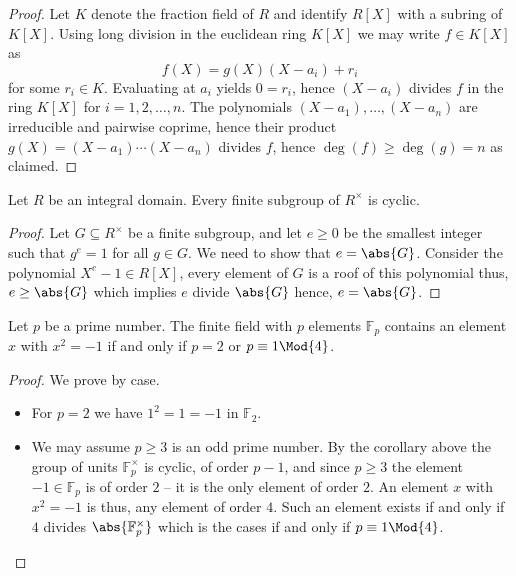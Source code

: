 \documentclass[12pt, a4paper]{article}
\begin{document}
\begin{proof}
    Let \( K \) denote the fraction field of \( R \) and identify \( R[X] \) with a subring of \( K[X] \). Using long division in the euclidean ring \( K[X] \) we may write \( f \in K[X] \) as
    \[f(X) = g(X)(X - a_i) + r_i\]
    for some \( r_i \in K \). Evaluating at \( a_i \) yields \( 0 = r_i \), hence \( (X - a_i) \) divides \( f \) in the ring \( K[X] \) for \( i = 1, 2, \ldots, n \). The polynomials \( (X - a_1), \ldots, (X - a_n) \) are irreducible and pairwise coprime, hence their product \( g(X) = (X - a_1) \cdots (X - a_n) \) divides \( f \), hence \( \deg(f) \geq \deg(g) = n \) as claimed. 
\end{proof}

\begin{mdcor}
    Let \(R\) be an integral domain. Every finite subgroup of \(R^{\times}\) is cyclic.
\end{mdcor}

\begin{proof}
    Let \(G \subseteq R^{\times}\) be a finite subgroup, and let \(e\geq 0\) be the smallest integer such that \(g^e=1\) for all \(g\in G\). We need to show that \(e=\abs{G}\). Consider the polynomial \(X^{e}-1 \in R[X]\), every element of \(G\) is a roof of this polynomial thus, \(e\geq \abs{G}\) which implies \( e\) divide \(\abs{G}\) hence, \(e=\abs{G}\).
\end{proof}

\begin{mdcor}
    Let \(p\) be a prime number. The finite field with \(p\) elements \(\mathbb{F}_p\) contains an element \(x\) with \(x^2=-1\) if and only if \(p=2\) or \(p \equiv 1 \Mod{4}\).
\end{mdcor}

\begin{proof}
    We prove by case.
    \begin{itemize}
        \item For \(p=2\) we have \(1^2=1=-1\) in \(\mathbb{F}_2\). 
        \item We may assume \(p \geq 3\) is an odd prime number. By the corollary above the group of units \(\mathbb{F}_p^{\times}\) is cyclic, of order \(p-1\), and since \(p\geq 3\) the element \(-1 \in \mathbb{F}_p\) is of order \(2\) -- it is the only element of order \(2\). An element \(x\) with \(x^2 = -1\) is thus, any element of order \(4\). Such an element exists if and only if \(4\) divides \(\abs{\mathbb{F}_p^{\times}}\) which is the cases if and only if \(p \equiv 1 \Mod{4}\).
    \end{itemize}
\end{proof}
\end{document}
